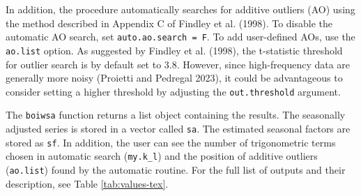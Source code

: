 \FloatBarrier

\FloatBarrier

In addition, the procedure automatically searches for additive outliers (AO) using the method described in Appendix C of Findley et al. (1998). To disable the automatic AO search, set \texttt{auto.ao.search\ =\ F}. To add user-defined AOs, use the \texttt{ao.list} option. As suggested by Findley et al. (1998), the t-statistic threshold for outlier search is by default set to \(3.8\). However, since high-frequency data are generally more noisy (Proietti and Pedregal 2023), it could be advantageous to consider setting a higher threshold by adjusting the \texttt{out.threshold} argument.

The \texttt{boiwsa} function returns a list object containing the results. The seasonally adjusted series is stored in a vector called \texttt{sa}. The estimated seasonal factors are stored as \texttt{sf}. In addition, the user can see the number of trigonometric terms chosen in automatic search (\texttt{my.k\_l}) and the position of additive outliers (\texttt{ao.list}) found by the automatic routine. For the full list of outputs and their description, see Table \ref{tab:values-tex}.

\FloatBarrier
\begin{table}[H]
\centering
\caption{\label{tab:values-tex}Output values for boiwsa}
\centering
{}
\end{table}
\FloatBarrier

